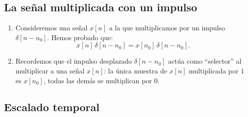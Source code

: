 \documentclass[11pt,a4paper,openany]{book}
\begin{document}
\subsection{La señal multiplicada con un impulso}

\begin{enumerate}
	\item Consideremos una señal $x[n]$ a la que
	multiplicamos por un impulso $\delta[n - n_{0}]$. Hemos probado que:
	\begin{equation}
		x[n] \, \delta[n - n_{0}] = x[n_{0}] \, \delta[n - n_{0}].
	\end{equation}
	
	\item Recordemos que el impulso desplazado $\delta[n - n_{0}]$
	actúa como ``selector'' al multiplicar a una señal $x[n]$:
	la única muestra de $x[n]$ multiplicada por $1$ es $x[n_{0}]$,
	todas las demás se multiplican por $0$.
\end{enumerate}

\subsection{Escalado temporal}
\end{document}
